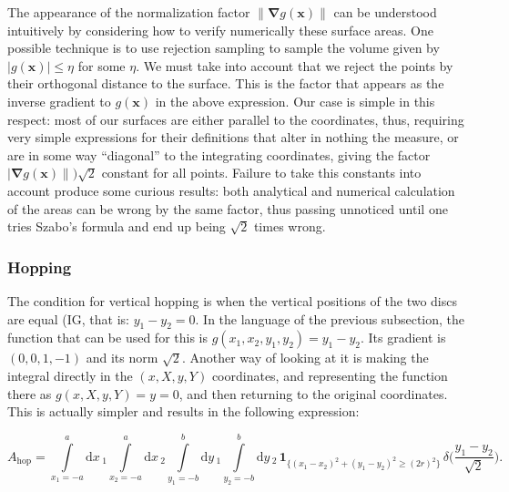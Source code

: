 \documentclass[superscriptaddress,pre,reprint,showpacs,onecolumn]{revtex4-1}
\newcommand{\rd}[1]{\mathrm{d}{#1} \,}
\newcommand{\indicatorsymbol}{\mathbf{1}}
\newcommand{\indicator}[1]{\indicatorsymbol_{ \{   #1 \} } }
\begin{document}
The appearance of the normalization factor $\| \mathbf{\nabla}g(\mathbf{x}) \|$ can be understood intuitively by considering how to verify numerically these surface areas. One possible technique is to use rejection sampling to sample the volume given by $|g(\mathbf{x})| \le \eta$ for some $\eta$. We must take into account that we reject
the points by their orthogonal distance to the surface. This is the factor that appears as the inverse gradient to $g(\mathbf{x})$ in the above expression. Our case is simple in this respect: most of our surfaces are either parallel to the coordinates, thus, requiring very simple expressions for their definitions that alter in nothing the measure, or are in some way ``diagonal'' to the integrating coordinates, giving the factor
$| \mathbf{\nabla}g(\mathbf{x}) \| )\sqrt{2}$ constant for all points. 
Failure to take this constants into account produce some curious results: both analytical
and numerical calculation of the areas can be wrong by the same factor,
thus passing unnoticed until one tries Szabo's formula and end up being
$\sqrt{2}$ times wrong.


\subsubsection{Hopping}

The condition for vertical hopping is when the vertical positions of the two discs are equal (IG, that is: $y_1-y_2=0$. In the language of the previous subsection, the function
that can be used for this is $g(x_1, x_2, y_1, y_2)= y_1-y_2$. Its gradient is $(0,0,1,-1)$ and its norm $\sqrt{2}$. Another way of looking at it is making the integral
directly in the $(x,X,y,Y)$ coordinates, and representing the function there as
$g(x,X,y,Y)=y=0$, and then returning to the original coordinates. This is actually
simpler and results in the following expression:
\begin{widetext}
\begin{equation}
 A_\text{hop} = \int\limits_{x_1 = -a}^a \rd x_1 \int\limits_{x_2 = -a}^a \rd x_2 
\int\limits_{y_1 = -b}^b \rd y_1 \int\limits_{y_2 = -b}^b \rd y_2 \, \indicator{ (x_1-x_2)^2 + (y_1-y_2)^2 \ge (2r)^2 } \, \delta \big(\frac{y_1-y_2}{\sqrt{2}}\big).
\end{equation}
\end{widetext}
\end{document}
